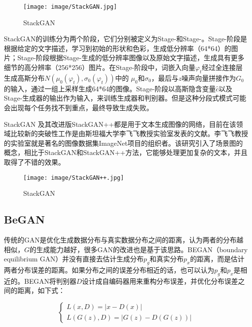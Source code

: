 \documentclass[lang=cn,a4paper,12pt,bibend=biber]{GAN}
\begin{document}
\begin{figure}[!htbp]
  \centering
  \texttt{[image: image/StackGAN.jpg]}
  \caption[]{StackGAN}
  \label{fig:StackGAN模型架构}
\end{figure}

StackGAN的训练分为两个阶段，它们分别被定义为Stage-\uppercase\expandafter{}和Stage-\uppercase\expandafter{}。Stage-\uppercase\expandafter{}阶段是根据给定的文字描述，学习到初始的形状和色彩，生成低分辨率（64*64）的图片；Stage-\uppercase\expandafter{}阶段根据Stage-\uppercase\expandafter{}生成的低分辨率图像以及原始文字描述，生成具有更多细节的高分辨率（256*256）图片。在Stage-\uppercase\expandafter{}阶段中，词嵌入向量$\varphi_{t}$经过全连接层生成高斯分布$N(\mu_0(\varphi_t),\sigma_0(\varphi_t))$中的 $\mu_0$和$\sigma_0$，最后与$z$噪声向量拼接作为$G_0$的输入，通过一组上采样生成64*64的图像。Stage-\uppercase\expandafter{}阶段以高斯隐含变量$\hat{c}$以及Stage-\uppercase\expandafter{}生成器的输出作为输入，来训练生成器和判别器。但是这种分段式模式可能会出现每个任务找不到重点，最终导致生成失败。

StackGAN 及其改进版StackGAN++都是用于文本生成图像的网络，目前在该领域比较新的突破性工作是由斯坦福大学李飞飞教授实验室发表的文献。李飞飞教授的实验室就是著名的图像数据集ImageNet项目的组织者。该研究引入了场景图的概念，相比于StackGAN和StackGAN++方法，它能够处理更加复杂的文本，并且取得了不错的效果。

\begin{figure}[!htbp]
  \centering
  \texttt{[image: image/StackGAN++.jpg]}
  \caption[]{StackGAN}
  \label{fig:StackGAN++模型架构}
\end{figure}

\subsection{BeGAN}

传统的GAN是优化生成数据分布与真实数据分布之间的距离，认为两者的分布越相似，$G$的生成能力越好，很多GAN的改进也是基于该思路。BEGAN（boundary equilibrium GAN）并没有直接去估计生成分布$p_g$和真实分布$p_x$的距离，而是估计两者分布误差的距离。如果分布之间的误差分布相近的话，也可以认为$p_g$和$p_x$是相近的。BEGAN将判别器$D$设计成自编码器用来重构分布误差，并优化分布误差之间的距离，如下式：

\begin{equation}
  \left\{\begin{array}{l}
    L(x, D)=|x-D(x)| \\
    L(G(z), D)=|G(z)-D(G(z))|
  \end{array}\right.
\end{equation}
\end{document}
